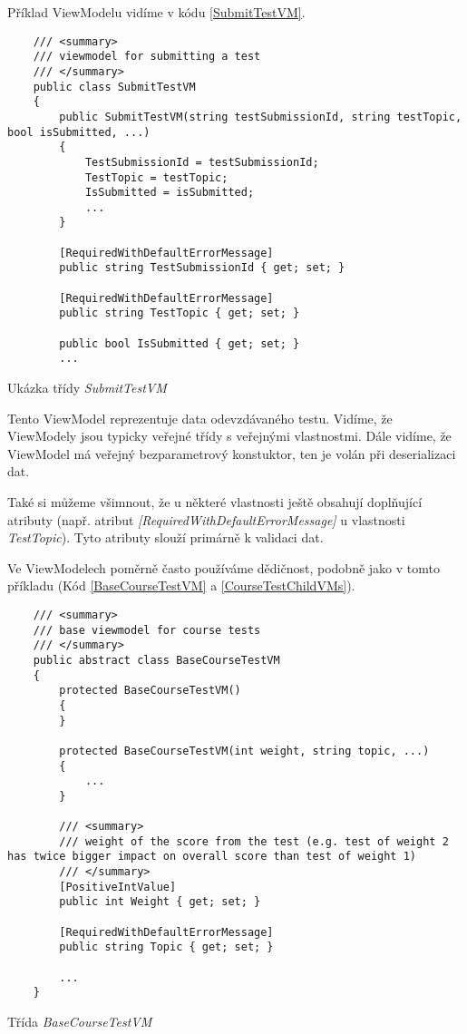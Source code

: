 Příklad ViewModelu vidíme v kódu \ref{SubmitTestVM}.

\begin{program}
	\begin{lstlisting}
	/// <summary>
	/// viewmodel for submitting a test
	/// </summary>
	public class SubmitTestVM
	{	
		public SubmitTestVM(string testSubmissionId, string testTopic, bool isSubmitted, ...)
		{
			TestSubmissionId = testSubmissionId;
			TestTopic = testTopic;
			IsSubmitted = isSubmitted;
			...
		}
		
		[RequiredWithDefaultErrorMessage]
		public string TestSubmissionId { get; set; }
		
		[RequiredWithDefaultErrorMessage]
		public string TestTopic { get; set; }
		
		public bool IsSubmitted { get; set; }
		...
	\end{lstlisting}
	\caption{Ukázka třídy \textit{SubmitTestVM}}
	\label{SubmitTestVM}
\end{program}

Tento ViewModel reprezentuje data odevzdávaného testu. Vidíme, že ViewModely jsou typicky veřejné třídy s veřejnými vlastnostmi. Dále vidíme, že ViewModel má veřejný bezparametrový konstuktor, ten je volán při deserializaci dat.

Také si můžeme všimnout, že u některé vlastnosti ještě obsahují doplňující atributy (např. atribut \textit{[RequiredWithDefaultErrorMessage]} u vlastnosti \textit{TestTopic}). Tyto atributy slouží primárně k validaci dat.

Ve ViewModelech poměrně často používáme dědičnost, podobně jako v tomto příkladu (Kód \ref{BaseCourseTestVM} a \ref{CourseTestChildVMs}).

\begin{program}
	\begin{lstlisting}
	/// <summary>
	/// base viewmodel for course tests
	/// </summary>
	public abstract class BaseCourseTestVM
	{
		protected BaseCourseTestVM()
		{
		}
		
		protected BaseCourseTestVM(int weight, string topic, ...)
		{
			...
		}
		
		/// <summary>
		/// weight of the score from the test (e.g. test of weight 2 has twice bigger impact on overall score than test of weight 1)
		/// </summary>
		[PositiveIntValue]
		public int Weight { get; set; }

		[RequiredWithDefaultErrorMessage]
		public string Topic { get; set; }
	
		...
	}
	\end{lstlisting}
	\caption{Třída \textit{BaseCourseTestVM}}
	\label{BaseCourseTestVM}
\end{program}

